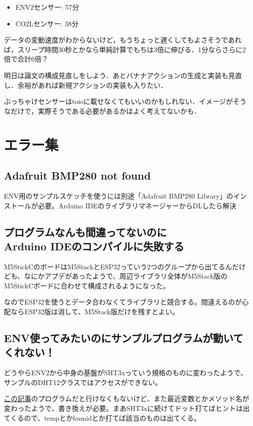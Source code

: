 \documentclass[fleqn,twocolumn]{mynote}
\begin{document}
  \begin{itemize}
    \item ENV2センサー: 57分
    \item CO2Lセンサー: 38分
  \end{itemize}

  データの変動速度がわからないけど，もうちょっと遅くしてもよさそうであれば，スリープ時間30秒とかなら単純計算でもちは3倍に伸びる．1分ならさらに2倍で合計6倍？

  明日は論文の構成見直しをしよう．あとバナナアクションの生成と実装も見直し．余裕があれば新規アクションの実装も入りたい．

  ぶっちゃけセンサーはtoioに載せなくてもいいのかもしれない．イメージがそうなだけで，実際そうである必要があるかはよく考えてないかも．

  \section*{エラー集}
  \subsection*{Adafruit BMP280 not found}
  ENV用のサンプルスケッチを使うには別途「Adafruit BMP280 Library」のインストールが必要。Arduino
  IDEのライブラリマネージャーからDLしたら解決

  \subsection*{プログラムなんも間違ってないのに\\Arduino IDEのコンパイルに失敗する}
  M5StickCのボードはM5StackとESP32っていう2つのグループから出てるんだけども、なにかアプデがあったようで、周辺ライブラリ全体がM5Stack版のM5StickCボードに合わせて構成されるようになった。

  なのでESP32を使うとデータ合わなくてライブラリと競合する。間違えるのが心配ならESP32版は消して、M5Stack版だけを残すとよい。

  \subsection*{ENV使ってみたいのにサンプルプログラムが動いてくれない！}
  どうやらENV2から中身の基盤がSHT3xっていう規格のものに変わったようで、サンプルのDHT12クラスではアクセスができない。

  \href{https://qiita.com/visyeii/items/e28f8500f43166710664}{この記事}のプログラムだと行けなくもないけど、また最近変数とかメソッド名が変わったようで、書き換えが必要。まあSHT3xに続けてドット打てばヒントは出てくるので、tempとかhumidとか打てば該当のものは出てくる。
\end{document}
